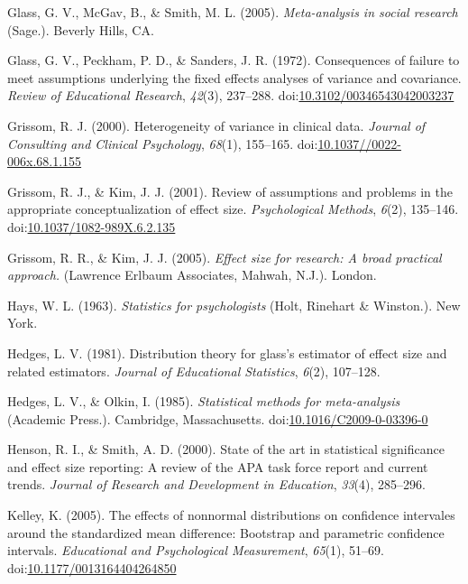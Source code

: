 \documentclass[
  man,floatsintext]{apa6}
\begin{document}
\leavevmode\hypertarget{ref-Glass_et_al_1981}{}%
Glass, G. V., McGav, B., \& Smith, M. L. (2005). \emph{Meta-analysis in social research} (Sage.). Beverly Hills, CA.

\leavevmode\hypertarget{ref-Glass_et_al_1972}{}%
Glass, G. V., Peckham, P. D., \& Sanders, J. R. (1972). Consequences of failure to meet assumptions underlying the fixed effects analyses of variance and covariance. \emph{Review of Educational Research}, \emph{42}(3), 237--288. doi:\href{https://doi.org/10.3102/00346543042003237}{10.3102/00346543042003237}

\leavevmode\hypertarget{ref-Grissom_2000}{}%
Grissom, R. J. (2000). Heterogeneity of variance in clinical data. \emph{Journal of Consulting and Clinical Psychology}, \emph{68}(1), 155--165. doi:\href{https://doi.org/10.1037//0022-006x.68.1.155}{10.1037//0022-006x.68.1.155}

\leavevmode\hypertarget{ref-Grissom_Kim_2001}{}%
Grissom, R. J., \& Kim, J. J. (2001). Review of assumptions and problems in the appropriate conceptualization of effect size. \emph{Psychological Methods}, \emph{6}(2), 135--146. doi:\href{https://doi.org/10.1037/1082-989X.6.2.135}{10.1037/1082-989X.6.2.135}

\leavevmode\hypertarget{ref-Grissom_and_kim_2005}{}%
Grissom, R. R., \& Kim, J. J. (2005). \emph{Effect size for research: A broad practical approach.} (Lawrence Erlbaum Associates, Mahwah, N.J.). London.

\leavevmode\hypertarget{ref-Hays_1963}{}%
Hays, W. L. (1963). \emph{Statistics for psychologists} (Holt, Rinehart \& Winston.). New York.

\leavevmode\hypertarget{ref-Hedges_1981}{}%
Hedges, L. V. (1981). Distribution theory for glass's estimator of effect size and related estimators. \emph{Journal of Educational Statistics}, \emph{6}(2), 107--128.

\leavevmode\hypertarget{ref-Hedges_Olkin_1985}{}%
Hedges, L. V., \& Olkin, I. (1985). \emph{Statistical methods for meta-analysis} (Academic Press.). Cambridge, Massachusetts. doi:\href{https://doi.org/10.1016/C2009-0-03396-0}{10.1016/C2009-0-03396-0}

\leavevmode\hypertarget{ref-Henson_Smith_2000}{}%
Henson, R. I., \& Smith, A. D. (2000). State of the art in statistical significance and effect size reporting: A review of the APA task force report and current trends. \emph{Journal of Research and Development in Education}, \emph{33}(4), 285--296.

\leavevmode\hypertarget{ref-Kelley_2005}{}%
Kelley, K. (2005). The effects of nonnormal distributions on confidence intervales around the standardized mean difference: Bootstrap and parametric confidence intervals. \emph{Educational and Psychological Measurement}, \emph{65}(1), 51--69. doi:\href{https://doi.org/10.1177/0013164404264850}{10.1177/0013164404264850}
\end{document}
